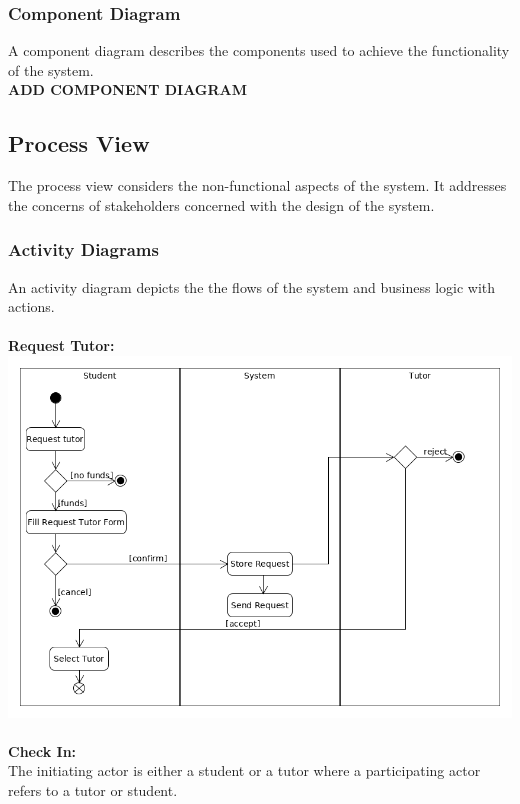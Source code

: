 \documentclass[12pt]{article}
\begin{document}
\subsubsection{Component Diagram}
A component diagram describes the components used to achieve the functionality of the system.\\
\textbf{ADD COMPONENT DIAGRAM}


\subsection{Process View}
The process view considers the non-functional aspects of the system. It addresses the concerns of stakeholders concerned
with the design of the system.

\subsubsection{Activity Diagrams}
An activity diagram depicts the the flows of the system and business logic with actions.\\
\\\textbf{Request Tutor:}\\
\includegraphics[width=140mm]{./activity_diagram/request_tutor.png}
\\\\\textbf{Check In:}\\
The initiating actor is either a student or a tutor where a participating actor refers to a tutor or student.\\
\end{document}
